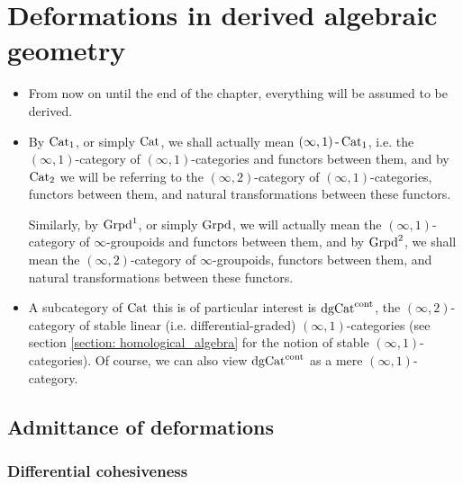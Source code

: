     \section{Deformations in derived algebraic geometry}
        \begin{convention} \label{conv: deformation_theory_everything_is_derived}
            \noindent
            \begin{itemize}
                \item From now on until the end of the chapter, everything will be assumed to be derived. 
                \item By $\mathrm{Cat}_1$, or simply $\mathrm{Cat}$, we shall actually mean $(\infty, 1)\operatorname{-}\mathrm{Cat}_1$, i.e. the $(\infty, 1)$-category of $(\infty, 1)$-categories and functors between them, and by $\mathrm{Cat}_2$ we will be referring to the $(\infty, 2)$-category of $(\infty, 1)$-categories, functors between them, and natural transformations between these functors. 
                
                Similarly, by $\mathrm{Grpd}^1$, or simply $\mathrm{Grpd}$, we will actually mean the $(\infty, 1)$-category of $\infty$-groupoids and functors between them, and by $\mathrm{Grpd}^2$, we shall mean the $(\infty, 2)$-category of $\infty$-groupoids, functors between them, and natural transformations between these functors.
                \item A subcategory of $\mathrm{Cat}$ this is of particular interest is $\mathrm{dg}\mathrm{Cat}^{\mathrm{cont}}$, the $(\infty, 2)$-category of stable linear (i.e. differential-graded) $(\infty, 1)$-categories (see section \ref{section: homological_algebra} for the notion of stable $(\infty, 1)$-categories). Of course, we can also view $\mathrm{dg}\mathrm{Cat}^{\mathrm{cont}}$ as a mere $(\infty, 1)$-category.
            \end{itemize}
        \end{convention}
        
        \subsection{Admittance of deformations}
            \subsubsection{Differential cohesiveness}
                
        
